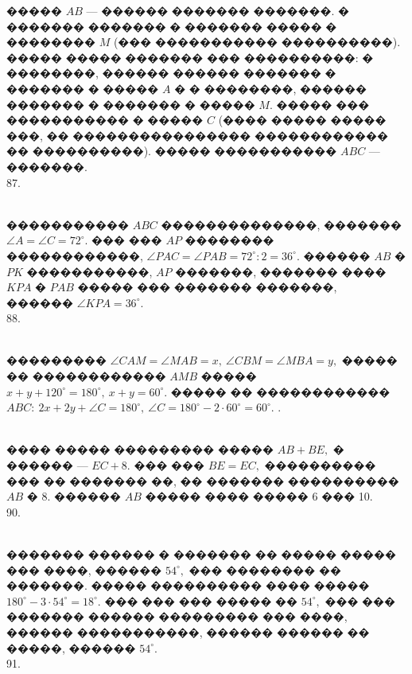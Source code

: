 \documentclass[12pt]{article}
\begin{document}
����� $AB$ --- ������ ������� �������. � ������� ������� � ������� ����� � �������� $M$ (��� ����������� ����������). ����� ����� ������� ��� ����������: � ��������, ������ ������ ������� � ������� � ����� $A$ � � ��������, ������ ������� � ������� � ����� $M.$ ����� ��� ����������� � ����� $C$ (���� ����� ����� ���, �� ���������������� ������������ �� ����������). ����� ����������� $ABC$ --- �������.\\
87. \begin{figure}[ht!]
\end{figure}\\
����������� $ABC$ ��������������, ������� $\angle A=\angle C =72^\circ.$ ��� ��� $AP$ �������� ������������, $\angle PAC=\angle PAB=72^\circ:2=36^\circ.$ ������ $AB$ � $PK$ �����������, $AP$ �������, ������� ���� $KPA$ � $PAB$ ����� ��� ������� �������, ������ $\angle KPA=36^\circ.$\\
88. \begin{figure}[ht!]
\end{figure}\\
��������� $\angle CAM=\angle MAB=x,\ \angle CBM=\angle MBA=y,$ ����� �� ������������ $AMB$ ����� $x+y+120^\circ=180^\circ,\ x+y=60^\circ.$ ����� �� ������������ $ABC:\ 2x+2y+\angle C=180^\circ,\ \angle C=180^\circ-2\cdot60^\circ=60^\circ.$\newpage
{}. \begin{figure}[ht!]
\end{figure}\\
���� ����� ��������� ����� $AB+BE,$ � ������ --- $EC+8.$ ��� ��� $BE=EC,$ ���������� ��� �� ������� ��, �� ������� ���������� $AB$ � 8. ������ $AB$ ����� ���� ����� 6 ��� 10.\\
90. \begin{figure}[ht!]
\end{figure}\\������� ������ � ������� �� ����� ����� ��� ����, ������ $54^\circ,$ ��� �������� �� �������. ����� ���������� ���� ����� $180^\circ-3\cdot54^\circ=18^\circ.$ ��� ��� ��� ����� �� $54^\circ,$ ��� ��� ������� ������ ��������� ��� ����, ������ �����������, ������ ������ �� �����, ������ $54^\circ.$\\
91. \begin{figure}[ht!]
\end{figure}\\
\end{document}
